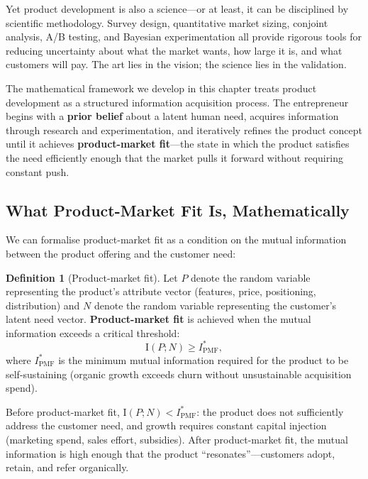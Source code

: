 \documentclass[12pt,a4paper,oneside]{book}
\theoremstyle{definition}
\newtheorem{definition}[theorem]{Definition}
\theoremstyle{remark}
\newcommand{\MI}{\mathrm{I}}
\begin{document}
Yet product development is also a science---or at least, it can be disciplined by
scientific methodology. Survey design, quantitative market sizing, conjoint analysis,
A/B testing, and Bayesian experimentation all provide rigorous tools for reducing
uncertainty about what the market wants, how large it is, and what customers will pay.
The art lies in the vision; the science lies in the validation.

The mathematical framework we develop in this chapter treats product development as
a structured information acquisition process. The entrepreneur begins with a
\textbf{prior belief} about a latent human need, acquires information through research
and experimentation, and iteratively refines the product concept until it achieves
\textbf{product-market fit}---the state in which the product satisfies the need
efficiently enough that the market pulls it forward without requiring constant push.

\subsection{What Product-Market Fit Is, Mathematically}

We can formalise product-market fit as a condition on the mutual information between the
product offering and the customer need:

\begin{definition}[Product-market fit]\label{def:pmf}
Let $P$ denote the random variable representing the product's attribute vector
(features, price, positioning, distribution) and $N$ denote the random variable
representing the customer's latent need vector. \textbf{Product-market fit} is
achieved when the mutual information exceeds a critical threshold:
\begin{equation}\label{eq:pmf}
  \MI(P; N) \geq I^*_{\text{PMF}},
\end{equation}
where $I^*_{\text{PMF}}$ is the minimum mutual information required for the product to
be self-sustaining (organic growth exceeds churn without unsustainable acquisition spend).
\end{definition}

Before product-market fit, $\MI(P; N) < I^*_{\text{PMF}}$: the product does not
sufficiently address the customer need, and growth requires constant capital injection
(marketing spend, sales effort, subsidies). After product-market fit, the mutual
information is high enough that the product ``resonates''---customers adopt, retain, and
refer organically.
\end{document}
